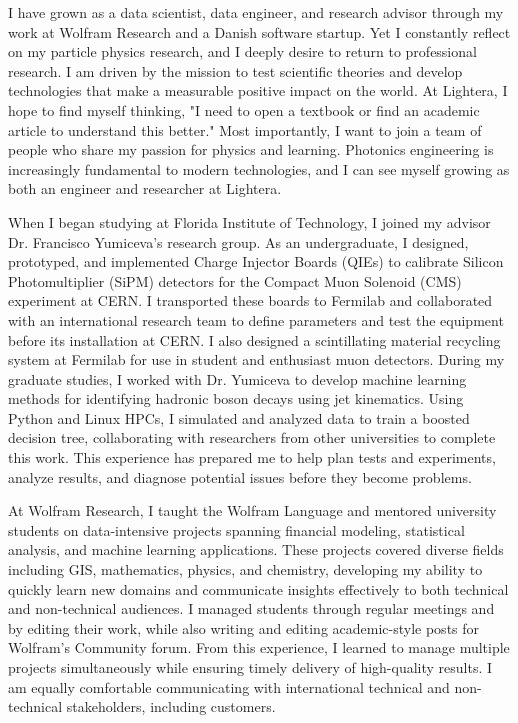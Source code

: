 \documentclass[11pt,a4]{article}
\begin{document}
I have grown as a data scientist, data engineer, and research advisor through my work at Wolfram Research and a Danish software startup. Yet I constantly reflect on my particle physics research, and I deeply desire to return to professional research. I am driven by the mission to test scientific theories and develop technologies that make a measurable positive impact on the world. At Lightera, I hope to find myself thinking, "I need to open a textbook or find an academic article to understand this better." Most importantly, I want to join a team of people who share my passion for physics and learning. Photonics engineering is increasingly fundamental to modern technologies, and I can see myself growing as both an engineer and researcher at Lightera.

When I began studying at Florida Institute of Technology, I joined my advisor Dr. Francisco Yumiceva's research group. As an undergraduate, I designed, prototyped, and implemented Charge Injector Boards (QIEs) to calibrate Silicon Photomultiplier (SiPM) detectors for the Compact Muon Solenoid (CMS) experiment at CERN. I transported these boards to Fermilab and collaborated with an international research team to define parameters and test the equipment before its installation at CERN. I also designed a scintillating material recycling system at Fermilab for use in student and enthusiast muon detectors. During my graduate studies, I worked with Dr. Yumiceva to develop machine learning methods for identifying hadronic boson decays using jet kinematics. Using Python and Linux HPCs, I simulated and analyzed data to train a boosted decision tree, collaborating with researchers from other universities to complete this work. This experience has prepared me to help plan tests and experiments, analyze results, and diagnose potential issues before they become problems.

At Wolfram Research, I taught the Wolfram Language and mentored university students on data-intensive projects spanning financial modeling, statistical analysis, and machine learning applications. These projects covered diverse fields including GIS, mathematics, physics, and chemistry, developing my ability to quickly learn new domains and communicate insights effectively to both technical and non-technical audiences. I managed students through regular meetings and by editing their work, while also writing and editing academic-style posts for Wolfram's Community forum. From this experience, I learned to manage multiple projects simultaneously while ensuring timely delivery of high-quality results. I am equally comfortable communicating with international technical and non-technical stakeholders, including customers.
\end{document}
